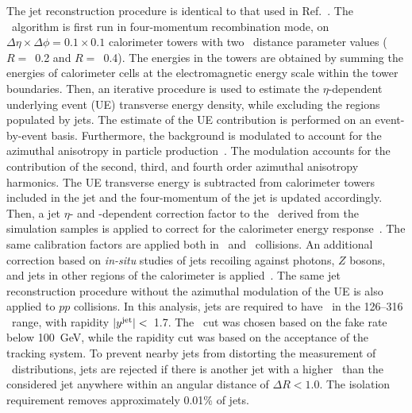 
The jet reconstruction procedure is identical to that used in Ref.~\cite{2019108}. 
The \antikt\ algorithm is first run in four-momentum recombination mode, on
$\Delta \eta \times \Delta \phi = 0.1\times 0.1$  calorimeter towers with two \antikt\ distance parameter values ($R=$~0.2 and $R=$~0.4). The energies in the towers are obtained by summing the
	energies of calorimeter cells at the electromagnetic energy scale within the tower boundaries. Then,
	  an iterative procedure is used to estimate the $\eta$-dependent underlying event (UE)  transverse energy density, while excluding the regions populated by jets. The estimate of the UE contribution is performed on an event-by-event basis.
	Furthermore, the background is modulated to account for the azimuthal anisotropy in particle production~\cite{ATLAS:2012at}. The modulation accounts for the contribution of the second, third, and fourth order azimuthal anisotropy harmonics.
	The UE transverse energy is subtracted from calorimeter towers included in the jet and the four-momentum of the jet is updated accordingly.
	  Then, a jet $\eta$- and \pT-dependent  correction factor to the \ptjet\ 
	  derived from the simulation samples is applied to correct for the calorimeter energy
	  response~\cite{Aaboud:2017jcu}. The same calibration factors are applied both 
in \pp\ and \pbpb\ collisions.
An additional correction based on \textit{in-situ} studies of jets recoiling against photons, $Z$ bosons, and jets in other regions of the calorimeter is
	  applied~\cite{ATL-PHYS-PUB-2015-036,2019167}. The same jet reconstruction procedure without the
	  azimuthal modulation of the UE is also applied to $pp$ collisions.
	  In this analysis, jets are required to have \ptjet\ in the 126--316 \GeV\ range, with rapidity  $|\mbox{$y^{\mathrm{jet}}$}|<$~1.7. The \ptjet\ cut was chosen based on the fake rate below \mbox{100 GeV}, while the rapidity cut was based on the acceptance of the tracking system.
 To prevent nearby jets from distorting the measurement of \Dptr\ distributions, 
jets are rejected if there is another jet with a higher \ptjet\ than the considered jet anywhere
within an angular distance of $\Delta R < 1.0$. The isolation requirement removes approximately 0.01\% of jets.

